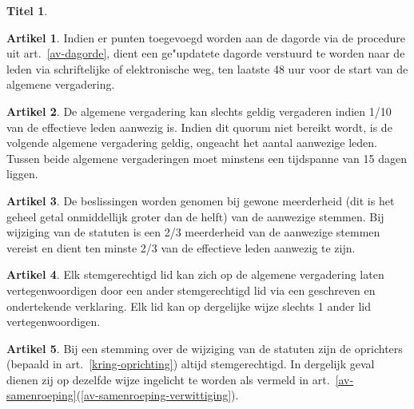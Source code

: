 \documentclass[a4paper,10pt]{article}
\theoremstyle{definition}
\newtheorem{titel}{\newline\Large Titel}
\newtheorem{artikelbase}{\large Artikel}
\newenvironment{artikel}
  {\begin{artikelbase}}
  {\smallskip
   \end{artikelbase}}
\newcommand{\ttextcr}{\hfill\newline}
\begin{document}
\begin{titel}
  \begin{artikel}\ttextcr
    Indien er punten toegevoegd worden aan de dagorde via de procedure uit art.~\ref{av-dagorde}, dient een ge"updatete dagorde verstuurd te worden naar de leden via schriftelijke of elektronische weg, ten laatste 48 uur voor de start van de algemene vergadering.
  \end{artikel}

  \begin{artikel}\ttextcr
    De algemene vergadering kan slechts geldig vergaderen indien 1/10 van de effectieve leden aanwezig is.
    Indien dit quorum niet bereikt wordt, is de volgende algemene vergadering geldig, ongeacht het aantal aanwezige leden.
    Tussen beide algemene vergaderingen moet minstens een tijdspanne van 15 dagen liggen.
  \end{artikel}

  \begin{artikel}\label{av-beslissen}\ttextcr
    De beslissingen worden genomen bij gewone meerderheid (dit is het geheel getal onmiddellijk groter dan de helft) van de aanwezige stemmen.
    Bij wijziging van de statuten is een 2/3 meerderheid van de aanwezige stemmen vereist en dient ten minste 2/3 van de effectieve leden aanwezig te zijn.
  \end{artikel}

  \begin{artikel}\ttextcr
    Elk stemgerechtigd lid kan zich op de algemene vergadering laten vertegenwoordigen door een ander stemgerechtigd lid via een geschreven en ondertekende verklaring.
    Elk lid kan op dergelijke wijze slechts 1 ander lid vertegenwoordigen.
  \end{artikel}

  \begin{artikel}\ttextcr
    Bij een stemming over de wijziging van de statuten zijn de oprichters (bepaald in art.~\ref{kring-oprichting}) altijd stemgerechtigd.
    In dergelijk geval dienen zij op dezelfde wijze ingelicht te worden als vermeld in art.~\ref{av-samenroeping}(\ref{av-samenroeping-verwittiging}).
  \end{artikel}


\end{titel}

\end{document}
